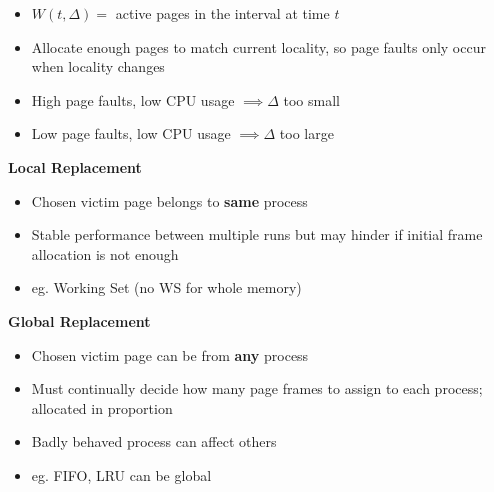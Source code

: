\documentclass[a4paper, 12pt]{article}
\begin{document}
\begin{multicols*}{4}
\begin{itemize}
	\item $W(t, \Delta) =$ active pages in the interval at time $t$
	\item Allocate enough pages to match current locality, so page faults only occur when locality changes
	\item High page faults, low CPU usage $\implies \Delta$ too small 
	\item Low page faults, low CPU usage $\implies \Delta$ too large
\end{itemize}
\textbf{Local Replacement}
\begin{itemize}
	\item Chosen victim page belongs to \textbf{same} process
	\item Stable performance between multiple runs but may hinder if initial frame allocation is not enough
	\item eg. Working Set (no WS for whole memory)
\end{itemize}
\textbf{Global Replacement}
\begin{itemize}
	\item Chosen victim page can be from \textbf{any} process
	\item Must continually decide how many page frames to assign to each process; allocated in proportion
	\item Badly behaved process can affect others
	\item eg. FIFO, LRU can be global
\end{itemize}

\medskip


\end{multicols*}
\end{document}
